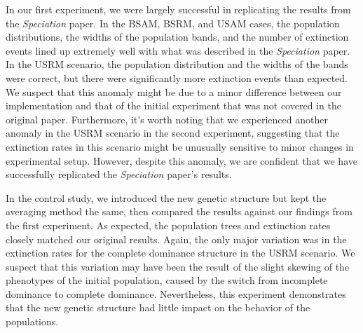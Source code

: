\documentclass{article}
\begin{document}
In our first experiment, we were largely successful in replicating the results from the \textit{Speciation} paper. In the BSAM, BSRM, and USAM cases, the population distributions, the widths of the population bands, and the number of extinction events lined up extremely well with what was described in the \textit{Speciation} paper. In the USRM scenario, the population distribution and the widths of the bands were correct, but there were significantly more extinction events than expected. We suspect that this anomaly might be due to a minor difference between our implementation and that of the initial experiment that was not covered in the original paper. Furthermore, it’s worth noting that we experienced another anomaly in the USRM scenario in the second experiment, suggesting that the extinction rates in this scenario might be unusually sensitive to minor changes in experimental setup. However, despite this anomaly, we are confident that we have successfully replicated the \textit{Speciation} paper’s results. 

In the control study, we introduced the new genetic structure but kept the averaging method the same, then compared the results against our findings from the first experiment. As expected, the population trees and extinction rates closely matched our original results. Again, the only major variation was in the extinction rates for the complete dominance structure in the USRM scenario. We suspect that this variation may have been the result of the slight skewing of the phenotypes of the initial population, caused by the switch from incomplete dominance to complete dominance. Nevertheless, this experiment demonstrates that the new genetic structure had little impact on the behavior of the populations.

\newpage


\end{document}
